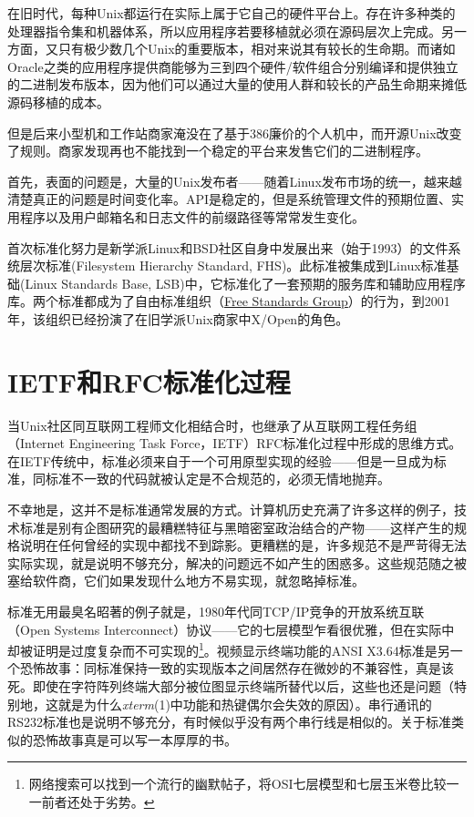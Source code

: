 \documentclass[12pt,oneside]{book}
\begin{document}
在旧时代，每种Unix都运行在实际上属于它自己的硬件平台上。存在许多种类的处理器指令集和机器体系，所以应用程序若要移植就必须在源码层次上完成。另一方面，又只有极少数几个Unix的重要版本，相对来说其有较长的生命期。而诸如Oracle之类的应用程序提供商能够为三到四个硬件/软件组合分别编译和提供独立的二进制发布版本，因为他们可以通过大量的使用人群和较长的产品生命期来摊低源码移植的成本。

但是后来小型机和工作站商家淹没在了基于386廉价的个人机中，而开源Unix改变了规则。商家发现再也不能找到一个稳定的平台来发售它们的二进制程序。

首先，表面的问题是，大量的Unix发布者——随着Linux发布市场的统一，越来越清楚真正的问题是时间变化率。API是稳定的，但是系统管理文件的预期位置、实用程序以及用户邮箱名和日志文件的前缀路径等常常发生变化。

首次标准化努力是新学派Linux和BSD社区自身中发展出来（始于1993）的文件系统层次标准(Filesystem Hierarchy Standard, FHS)。此标准被集成到Linux标准基础(Linux Standards Base, LSB)中，它标准化了一套预期的服务库和辅助应用程序库。两个标准都成为了自由标准组织（\href{http://www.freestandards.org/}{Free Standards Group}）的行为，到2001年，该组织已经扮演了在旧学派Unix商家中X/Open的角色。

\section{IETF和RFC标准化过程}
当Unix社区同互联网工程师文化相结合时，也继承了从互联网工程任务组（Internet Engineering Task Force，IETF）RFC标准化过程中形成的思维方式。在IETF传统中，标准必须来自于一个可用原型实现的经验——但是一旦成为标准，同标准不一致的代码就被认定是不合规范的，必须无情地抛弃。

不幸地是，这并不是标准通常发展的方式。计算机历史充满了许多这样的例子，技术标准是别有企图研究的最糟糕特征与黑暗密室政治结合的产物——这样产生的规格说明在任何曾经的实现中都找不到踪影。更糟糕的是，许多规范不是严苛得无法实际实现，就是说明不够充分，解决的问题远不如产生的困惑多。这些规范随之被塞给软件商，它们如果发现什么地方不易实现，就忽略掉标准。

标准无用最臭名昭著的例子就是，1980年代同TCP/IP竞争的开放系统互联（Open Systems  Interconnect）协议——它的七层模型乍看很优雅，但在实际中却被证明是过度复杂而不可实现的\footnote{网络搜索可以找到一个流行的幽默帖子，将OSI七层模型和七层玉米卷比较一一前者还处于劣势。}。视频显示终端功能的ANSI X3.64标准是另一个恐怖故事：同标准保持一致的实现版本之间居然存在微妙的不兼容性，真是该死。即使在字符阵列终端大部分被位图显示终端所替代以后，这些也还是问题（特别地，这就是为什么\textit{xterm}(1)中功能和热键偶尔会失效的原因）。串行通讯的RS232标准也是说明不够充分，有时候似乎没有两个串行线是相似的。关于标准类似的恐怖故事真是可以写一本厚厚的书。
\end{document}
